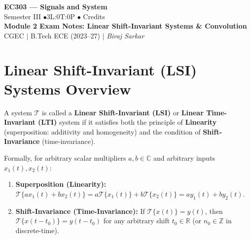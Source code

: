 \documentclass[12pt,a4paper]{article}
\begin{document}
\begin{center}
  {\LARGE\bfseries\color{myred} EC303 --- Signals and System}\\[5pt]
  {\normalsize\color{mydark} Semester III \quad$\bullet$\quad 3L:0T:0P \quad$\bullet$ Credits}\\[3pt]
  {\normalsize\color{myteal}\textbf{Module 2 Exam Notes: Linear Shift-Invariant Systems \& Convolution}}\\[3pt]
  {\small\color{mydark} CGEC \;$|$\; B.Tech ECE (2023--27) \;$|$\; \textit{Biraj Sarkar}}
\end{center}
\vspace{2pt}
\noindent{\color{myred}\rule{\linewidth}{1.5pt}}
\vspace{2pt}

\hypersetup{linkcolor=mydark}
\tableofcontents
\hypersetup{linkcolor=myteal}
\newpage

\section{Linear Shift-Invariant (LSI) Systems Overview}

\begin{tcolorbox}[defbox, title={\textbf{Definition: Linear Shift-Invariant (LSI / LTI) System}}]
A system $\mathcal{T}$ is called a \textbf{Linear Shift-Invariant (LSI)} or \textbf{Linear Time-Invariant (LTI)} system if it satisfies both the principle of \textbf{Linearity} (superposition: additivity and homogeneity) and the condition of \textbf{Shift-Invariance} (time-invariance).

Formally, for arbitrary scalar multipliers $a, b \in \mathbb{C}$ and arbitrary inputs $x_1(t), x_2(t)$:
\begin{enumerate}[topsep=2pt, itemsep=2pt]
  \item \textbf{Superposition (Linearity):} $\mathcal{T}\{a x_1(t) + b x_2(t)\} = a \mathcal{T}\{x_1(t)\} + b \mathcal{T}\{x_2(t)\} = a y_1(t) + b y_2(t)$.
  \item \textbf{Shift-Invariance (Time-Invariance):} If $\mathcal{T}\{x(t)\} = y(t)$, then $\mathcal{T}\{x(t - t_0)\} = y(t - t_0)$ for any arbitrary shift $t_0 \in \mathbb{R}$ (or $n_0 \in \mathbb{Z}$ in discrete-time).
\end{enumerate}
\end{tcolorbox}
\end{document}
